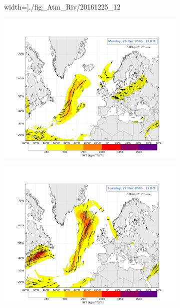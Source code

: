 \begin{figure}[t!]
\begin{subfigure}[b]{0.49\textwidth}
		width=\textwidth]{./fig_Atm_Riv/20161225_12}
		\caption{}\label{fig:AR25}
	\end{subfigure}
	\begin{subfigure}[b]{0.49\textwidth}
		\includegraphics[trim={4.2cm 3.9cm 4.3cm 5.1cm},clip,
		width=\textwidth]{./fig_Atm_Riv/20161226_12}
		\caption{}\label{fig:AR26}
	\end{subfigure}
	\begin{subfigure}[b]{0.49\textwidth}
		\includegraphics[trim={4.2cm 3.9cm 4.3cm 5.1cm},clip,
		width=\textwidth]{./fig_Atm_Riv/20161227_12}

\end{subfigure}
\end{figure}

